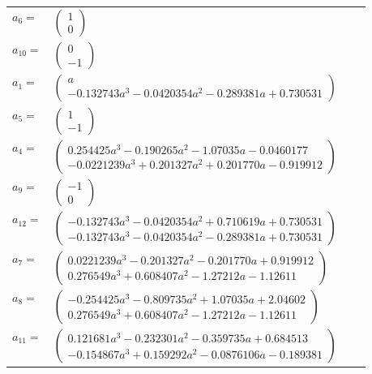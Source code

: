 \documentclass[1p]{elsarticle_modified}
\theoremstyle{definition}
\begin{document}
\begin{tabular}{m{7pt} m{180pt} m{7pt} m{180pt} }
\flushright $a_{6}=$&$\begin{pmatrix}1\\0\end{pmatrix}$ \\
\flushright $a_{10}=$&$\begin{pmatrix}0\\-1\end{pmatrix}$ \\
\flushright $a_{1}=$&$\begin{pmatrix}a\\-0.132743 a^{3}-0.0420354 a^{2}-0.289381 a+0.730531\end{pmatrix}$ \\
\flushright $a_{5}=$&$\begin{pmatrix}1\\-1\end{pmatrix}$ \\
\flushright $a_{4}=$&$\begin{pmatrix}0.254425 a^{3}-0.190265 a^{2}-1.07035 a-0.0460177\\-0.0221239 a^{3}+0.201327 a^{2}+0.201770 a-0.919912\end{pmatrix}$ \\
\flushright $a_{9}=$&$\begin{pmatrix}-1\\0\end{pmatrix}$ \\
\flushright $a_{12}=$&$\begin{pmatrix}-0.132743 a^{3}-0.0420354 a^{2}+0.710619 a+0.730531\\-0.132743 a^{3}-0.0420354 a^{2}-0.289381 a+0.730531\end{pmatrix}$ \\
\flushright $a_{7}=$&$\begin{pmatrix}0.0221239 a^{3}-0.201327 a^{2}-0.201770 a+0.919912\\0.276549 a^{3}+0.608407 a^{2}-1.27212 a-1.12611\end{pmatrix}$ \\
\flushright $a_{8}=$&$\begin{pmatrix}-0.254425 a^{3}-0.809735 a^{2}+1.07035 a+2.04602\\0.276549 a^{3}+0.608407 a^{2}-1.27212 a-1.12611\end{pmatrix}$ \\
\flushright $a_{11}=$&$\begin{pmatrix}0.121681 a^{3}-0.232301 a^{2}-0.359735 a+0.684513\\-0.154867 a^{3}+0.159292 a^{2}-0.0876106 a-0.189381\end{pmatrix}$ \\

\end{tabular}
\end{document}
